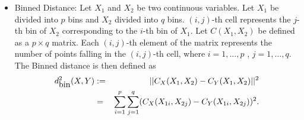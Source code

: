 \documentclass[12]{article}
\newcommand{\red}[1]{{\color{red} #1}}
\begin{document}
\begin{itemize}
\item Binned Distance:
Let $X_1$ and $X_2$ be two continuous variables. Let $X_1$ be divided into $p$ bins and $X_2$ divided into $q$ bins. $(i,j)$-th cell represents the $j$-th bin of $X_2$ corresponding to the $i$-th bin of $X_1$. Let $C(X_1,X_2)$ be defined as a $p \times q$ matrix. Each $(i,j)$-th element of the matrix represents the number of points falling in the $(i,j)$-th cell, where $i = 1, \dots, p$ , $j = 1, \dots, q$.
The Binned distance is then defined as
\begin{eqnarray*}
d_{\hbox{bin}}^2 (X, Y) &:=& ||C_X(X_1, X_2) - C_Y(X_1,X_2)||^2 \\ &=& \sum_{i=1}^p \sum_{j=1}^q (C_X(X_{1i},X_{2j}) - C_Y(X_{1i},X_{2j}))^2.
\end{eqnarray*}



\end{itemize}
\end{document}
